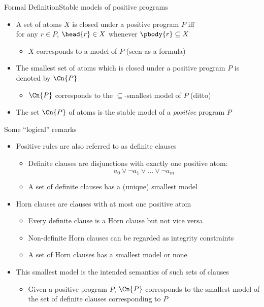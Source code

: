 \begin{frame}[c]{Formal Definition}{Stable models of positive programs}
  \begin{itemize}
  \item<2-> A set of atoms $X$ is \alert{closed under} a positive program $P$ iff
    \\for any $r\in P$, $\head{r}\in X$ whenever $\pbody{r}\subseteq X$
    \begin{itemize}
    \item $X$ corresponds to a model of $P$ (seen as a formula)
    \end{itemize}
    \medskip
  \item<3-> The \alert{smallest} set of atoms which is closed under a positive
    program $P$ is denoted by $\Cn{P}$
    \begin{itemize}
    \item $\Cn{P}$ corresponds to the $\subseteq$-smallest model of $P$ (ditto)
    \end{itemize}
    \medskip
  \item<4-> The set $\Cn{P}$ of atoms is the \alert{stable model} of a \emph{positive} program $P$
  \end{itemize}
\end{frame}
\begin{frame}{Some ``logical'' remarks}
  \begin{itemize}
  \item <1-> Positive rules are also referred to as \alert<1-2>{definite clauses}
    \begin{itemize}
    \item Definite clauses are disjunctions with \alert<1>{exactly one} positive atom:
      \[
      a_0\vee\neg a_1\vee\dots\vee\neg a_m
      \]
    \item A set of definite clauses has a (unique) \alert<3>{smallest model}
    \end{itemize}
    \medskip
  \item<2-> \alert<2>{Horn clauses} are clauses with \alert<2>{at most} one positive atom
    \begin{itemize}
    \item Every definite clause is a Horn clause but not vice versa
    \item Non-definite Horn clauses can be regarded as integrity constraints
      \smallskip
    \item A set of Horn clauses has a \alert<3>{smallest model} or none
    \end{itemize}
    \medskip
  \item<3-> This \alert<3>{smallest model} is the intended semantics of such sets of clauses
    \begin{itemize}
    \item Given a positive program $P$,
    $\Cn{P}$ corresponds to the smallest model of the set of
    definite clauses corresponding to $P$
  \end{itemize}
\end{itemize}
\end{frame}
%
